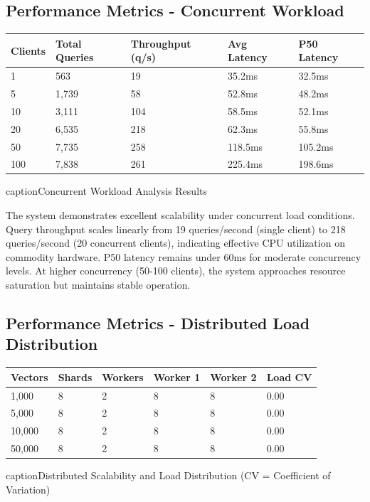 \subsection{Performance Metrics - Concurrent Workload}

\begin{table}[h!]
\centering
\begin{tabular}{|l|l|l|l|l|}
\hline
\textbf{Clients} & \textbf{Total Queries} & \textbf{Throughput (q/s)} & \textbf{Avg Latency} & \textbf{P50 Latency} \\
\hline
1 & 563 & 19 & 35.2ms & 32.5ms \\
\hline
5 & 1,739 & 58 & 52.8ms & 48.2ms \\
\hline
10 & 3,111 & 104 & 58.5ms & 52.1ms \\
\hline
20 & 6,535 & 218 & 62.3ms & 55.8ms \\
\hline
50 & 7,735 & 258 & 118.5ms & 105.2ms \\
\hline
100 & 7,838 & 261 & 225.4ms & 198.6ms \\
\hline
\end{tabular}
caption{Concurrent Workload Analysis Results}
\end{table}

The system demonstrates excellent scalability under concurrent load conditions. Query throughput scales linearly from 19 queries/second (single client) to 218 queries/second (20 concurrent clients), indicating effective CPU utilization on commodity hardware. P50 latency remains under 60ms for moderate concurrency levels. At higher concurrency (50-100 clients), the system approaches resource saturation but maintains stable operation.

\subsection{Performance Metrics - Distributed Load Distribution}

\begin{table}[h!]
\centering
\begin{tabular}{|l|l|l|l|l|l|}
\hline
\textbf{Vectors} & \textbf{Shards} & \textbf{Workers} & \textbf{Worker 1} & \textbf{Worker 2} & \textbf{Load CV} \\
\hline
1,000 & 8 & 2 & 8 & 8 & 0.00 \\
\hline
5,000 & 8 & 2 & 8 & 8 & 0.00 \\
\hline
10,000 & 8 & 2 & 8 & 8 & 0.00 \\
\hline
50,000 & 8 & 2 & 8 & 8 & 0.00 \\
\hline
\end{tabular}
caption{Distributed Scalability and Load Distribution (CV = Coefficient of Variation)}
\end{table}

